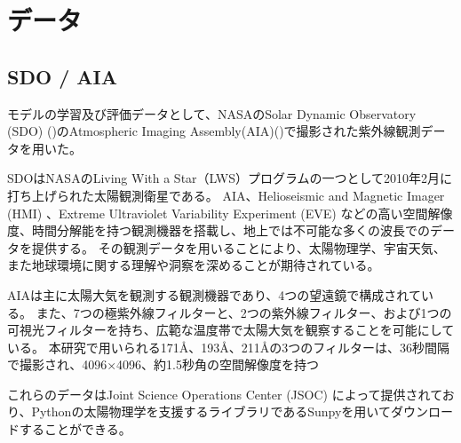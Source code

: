 \chapter{データ} 

\section{SDO / AIA}
モデルの学習及び評価データとして、NASAのSolar Dynamic Observatory (SDO) (\cite{pesnell2012solar})のAtmospheric Imaging Assembly(AIA)(\cite{lemen2012atmospheric})で撮影された紫外線観測データを用いた。

SDOはNASAのLiving With a Star（LWS）プログラムの一つとして2010年2月に打ち上げられた太陽観測衛星である。
AIA、Helioseismic and Magnetic Imager (HMI) 、Extreme Ultraviolet Variability Experiment (EVE) などの高い空間解像度、時間分解能を持つ観測機器を搭載し、地上では不可能な多くの波長でのデータを提供する。
その観測データを用いることにより、太陽物理学、宇宙天気、また地球環境に関する理解や洞察を深めることが期待されている。

AIAは主に太陽大気を観測する観測機器であり、4つの望遠鏡で構成されている。
また、7つの極紫外線フィルターと、2つの紫外線フィルター、および1つの可視光フィルターを持ち、広範な温度帯で太陽大気を観察することを可能にしている。
本研究で用いられる171Å、193Å、211Åの3つのフィルターは、36秒間隔で撮影され、4096×4096、約1.5秒角の空間解像度を持つ

これらのデータはJoint Science Operations Center (JSOC) によって提供されており、Pythonの太陽物理学を支援するライブラリであるSunpyを用いてダウンロードすることができる。

